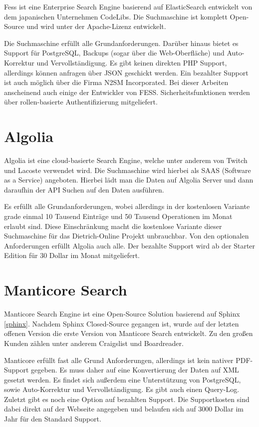 Fess ist eine Enterprise Search Engine basierend auf ElasticSearch entwickelt von dem japanischen Unternehmen CodeLibs. Die Suchmaschine ist komplett Open-Source und wird unter der Apache-Lizenz entwickelt.

Die Suchmaschine erfüllt alle Grundanforderungen. Darüber hinaus bietet es Support für PostgreSQL, Backups (sogar über die Web-Oberfläche) und Auto-Korrektur und Vervollständigung. Es gibt keinen direkten PHP Support, allerdings können anfragen über JSON geschickt werden. Ein bezahlter Support ist auch möglich über die Firma N2SM Incorporated. \cite{N2SM.2019} Bei dieser Arbeiten anscheinend auch einige der Entwickler von FESS. Sicherheitsfunktionen werden über rollen-basierte Authentifizierung mitgeliefert. \cite{CodeLibs.2019}

\section{Algolia}
\label{algolia}

Algolia ist eine cloud-basierte Search Engine, welche unter anderem von Twitch und Lacoste verwendet wird. Die Suchmaschine wird hierbei als SAAS (Software as a Service) angeboten.  Hierbei lädt man die Daten auf Algolia Server und dann daraufhin der API Suchen auf den Daten ausführen.

Es erfüllt alle Grundanforderungen, wobei allerdings in der kostenlosen Variante grade einmal 10 Tausend Einträge und 50 Tausend Operationen im Monat erlaubt sind. Diese Einschränkung macht die kostenlose Variante dieser Suchmaschine für das Dietrich-Online Projekt unbrauchbar. Von den optionalen Anforderungen erfüllt Algolia auch alle. Der bezahlte Support wird ab der Starter Edition für 30 Dollar im Monat mitgeliefert. \cite{Algolia.2019}

\section{Manticore Search}
\label{manticore}

Manticore Search Engine ist eine Open-Source Solution basierend auf Sphinx \ref{sphinx}. Nachdem Sphinx Closed-Source gegangen ist, wurde auf der letzten offenen Version die erste Version von Manticore Search entwickelt. Zu den großen Kunden zählen unter anderem Craigslist und Boardreader.

Manticore erfüllt fast alle Grund Anforderungen, allerdings ist kein nativer PDF-Support gegeben. Es muss daher auf eine Konvertierung der Daten auf XML gesetzt werden. Es findet sich außerdem eine Unterstützung von PostgreSQL, sowie Auto-Korrektur und Vervollständigung. Es gibt auch einen Query-Log. Zuletzt gibt es noch eine Option auf bezahlten Support. Die Supportkosten sind dabei direkt auf der Webseite angegeben und belaufen sich auf 3000 Dollar im Jahr für den Standard Support. \cite{ManticoreSoftwareLtd.2019}

